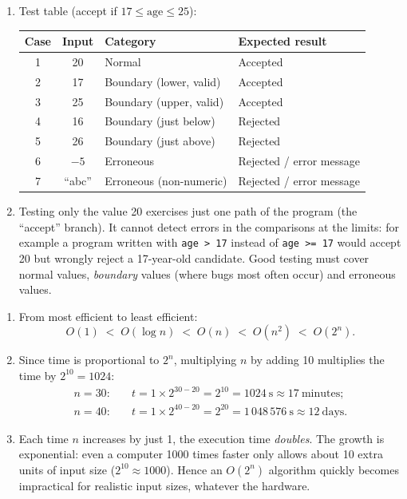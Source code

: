 \documentclass[11pt]{article}
\begin{document}
\begin{corrige}
\begin{enumerate}
\item Test table (accept if $17 \le \text{age} \le 25$):
\begin{center}
\begin{tabularx}{\linewidth}{|c|c|l|X|}
\hline
\rowcolor{popblueL} \textbf{Case} & \textbf{Input} & \textbf{Category} & \textbf{Expected result} \\
\hline
1 & 20 & Normal & Accepted \\
\hline
2 & 17 & Boundary (lower, valid) & Accepted \\
\hline
3 & 25 & Boundary (upper, valid) & Accepted \\
\hline
4 & 16 & Boundary (just below) & Rejected \\
\hline
5 & 26 & Boundary (just above) & Rejected \\
\hline
6 & $-5$ & Erroneous & Rejected / error message \\
\hline
7 & ``abc'' & Erroneous (non-numeric) & Rejected / error message \\
\hline
\end{tabularx}
\end{center}
\item Testing only the value 20 exercises just one path of the program (the ``accept'' branch). It cannot detect errors in the comparisons at the limits: for example a program written with \texttt{age > 17} instead of \texttt{age >= 17} would accept 20 but wrongly reject a 17-year-old candidate. Good testing must cover normal values, \emph{boundary} values (where bugs most often occur) and erroneous values.
\end{enumerate}
\end{corrige}

\begin{corrige}
\begin{enumerate}
\item From most efficient to least efficient:
\[ O(1) \;<\; O(\log n) \;<\; O(n) \;<\; O(n^2) \;<\; O(2^n). \]
\item Since time is proportional to $2^n$, multiplying $n$ by adding 10 multiplies the time by $2^{10} = 1024$:
\begin{align*}
n=30:\quad & t = 1 \times 2^{30-20} = 2^{10} = 1024\ \text{s} \approx 17\ \text{minutes};\\
n=40:\quad & t = 1 \times 2^{40-20} = 2^{20} = 1\,048\,576\ \text{s} \approx 12\ \text{days}.
\end{align*}
\item Each time $n$ increases by just 1, the execution time \emph{doubles}. The growth is exponential: even a computer 1000 times faster only allows about 10 extra units of input size ($2^{10} \approx 1000$). Hence an $O(2^n)$ algorithm quickly becomes impractical for realistic input sizes, whatever the hardware.
\end{enumerate}
\end{corrige}
\end{document}
